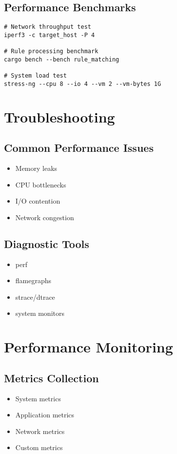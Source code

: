 \documentclass{article}
\begin{document}
\subsection{Performance Benchmarks}
\begin{verbatim}
# Network throughput test
iperf3 -c target_host -P 4

# Rule processing benchmark
cargo bench --bench rule_matching

# System load test
stress-ng --cpu 8 --io 4 --vm 2 --vm-bytes 1G
\end{verbatim}

\section{Troubleshooting}

\subsection{Common Performance Issues}
\begin{itemize}
    \item Memory leaks
    \item CPU bottlenecks
    \item I/O contention
    \item Network congestion
\end{itemize}

\subsection{Diagnostic Tools}
\begin{itemize}
    \item perf
    \item flamegraphs
    \item strace/dtrace
    \item system monitors
\end{itemize}

\section{Performance Monitoring}

\subsection{Metrics Collection}
\begin{itemize}
    \item System metrics
    \item Application metrics
    \item Network metrics
    \item Custom metrics
\end{itemize}
\end{document}
